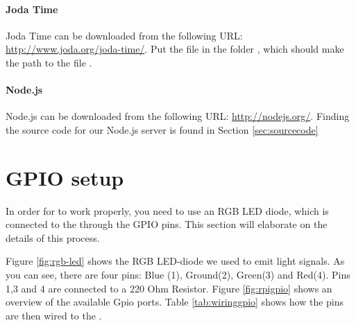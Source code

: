 \paragraph{Joda Time}
Joda Time can be downloaded from the following URL: \url{http://www.joda.org/joda-time/}. Put the file  in the folder , which should make the path to the file . 

\paragraph{Node.js}
Node.js can be downloaded from the following URL: \url{http://nodejs.org/}. Finding the source code for our Node.js server is found in Section \ref{sec:sourcecode}

\section{GPIO setup}
In order for \ab{} to work properly, you need to use an RGB LED diode, which is connected to the \rpi{} through the GPIO pins. This section will elaborate on the details of this process. 

Figure \ref{fig:rgb-led} shows the RGB LED-diode we used to emit light signals. As you can see, there are four pins: Blue (1), Ground(2), Green(3) and Red(4). Pins 1,3 and 4 are connected to a 220 Ohm Resistor. Figure \ref{fig:rpigpio} shows an overview of the available Gpio ports.  Table \ref{tab:wiringgpio} shows how the pins are then wired to the \rpi{}. 

